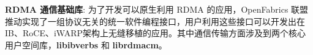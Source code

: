 {    \textbf{RDMA 通信基础库}: 为了开发可以原生利用 RDMA 的应用，OpenFabrics 联盟推动实现了一组协议无关的统一软件编程接口，用户利用这些接口可以开发出在 IB、RoCE、iWARP架构上无缝移植的应用。其中通信传输方面涉及到两个核心用户空间库，\textbf{libibverbs} 和 \textbf{librdmacm}。
}
